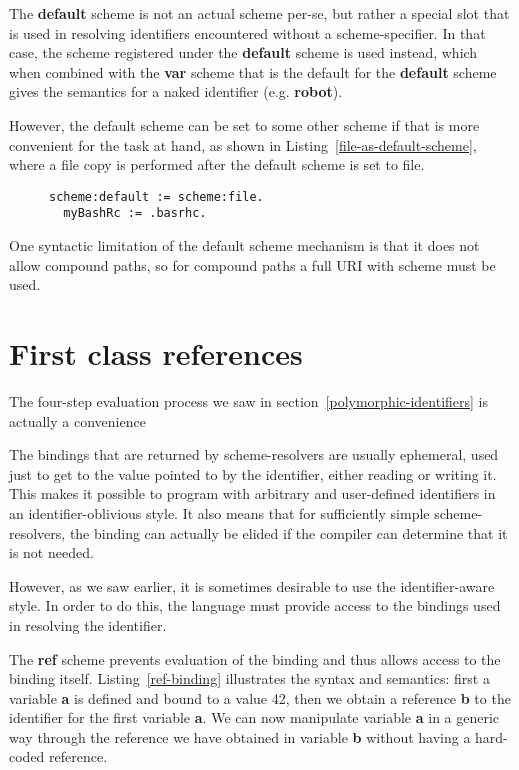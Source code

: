 \documentclass[preprint,authoryear]{acm_proc_article-sp}
\newcommand\mpw[1]{\mynote{Marcel}{#1}}
\begin{document}
The {\bf default} scheme is not an actual scheme per-se, but rather a special slot
that is used in resolving identifiers encountered without a scheme-specifier.
In that case, the scheme registered under the {\bf default} scheme is used
instead, which when combined with the {\bf var} scheme that is the default
for the {\bf default} scheme gives the semantics for a naked identifier (e.g. {\bf robot}).

However, the default scheme can be set to some other scheme if that is more
convenient for the task at hand, as shown in Listing~\ref{file-as-default-scheme},
where a file copy is performed after the default scheme is set to file.


\begin{figure}[htbp]
\begin{lstlisting}[style=L,label=file-as-default-scheme,caption=File copy with file: as default scheme.]
  scheme:default := scheme:file.
  myBashRc := .basrhc.
\end{lstlisting}
\end{figure}

One syntactic limitation of the default scheme mechanism is that it does not allow
compound paths, so for compound paths a full URI with scheme must be used.


\mpw{no changes yet beyond this point}

\section{First class references}
\label{references}
The four-step evaluation process we saw in section~\ref{polymorphic-identifiers} is
actually a convenience 

The bindings that are returned by scheme-resolvers are usually ephemeral, used just 
to get to the value pointed to by the identifier, either reading or writing it.  This
makes it possible to program with arbitrary and user-defined identifiers in
an identifier-oblivious style.  It also means that for sufficiently simple scheme-resolvers,
the binding can actually be elided if the compiler can determine that it is not needed.

However, as we saw earlier, it is sometimes
desirable to use the identifier-aware style.  In order to do this, the language
must provide access to the bindings used in resolving the identifier.

The {\bf ref} scheme prevents evaluation of the binding and thus allows access
to the binding itself.  Listing~\ref{ref-binding} illustrates the syntax and semantics:
first a variable {\bf a} is defined and bound to a value 42, then we obtain a reference {\bf b} to
the identifier for the first variable {\bf a}.  We can now manipulate variable {\bf a} 
in a generic way through the reference we have obtained in variable {\bf b} without
having a hard-coded reference. 
\end{document}
